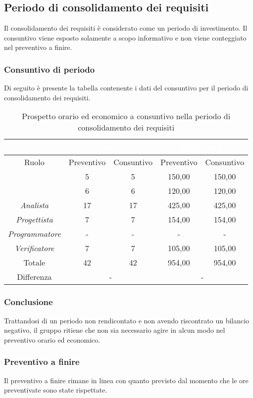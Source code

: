 \subsection{Periodo di consolidamento dei requisiti}
Il consolidamento dei requisiti è considerato come un periodo di investimento. Il consuntivo viene esposto solamente a scopo informativo e non viene conteggiato nel preventivo a finire.
\subsubsection{Consuntivo di periodo}
Di seguito è presente la tabella contenente i dati del consuntivo per il periodo di consolidamento dei requisiti.
\begin{table}[H]
	\centering
	\begin{tabular}{|c|c|c|c|c|}
		\rowcolor{darkblue} 
		&\multicolumn{2}{c|}{\textcolor{white}{Ore}}&\multicolumn{2}{c|}{\textcolor{white}{Costo in €}}\\ \hline
		Ruolo			&	Preventivo				&	Consuntivo		&	Preventivo	&	Consuntivo\\ \hline
		{\Responsabile}		&	5					&	5				&	150,00		&	150,00 \\ \hline
		{\Amministratore}	&	6					&	6				&	120,00		&	120,00 \\ \hline
		\textit{Analista}	&	17					&	17				&	425,00		&	425,00 \\ \hline
		\textit{Progettista}& 	7					&	7 				& 	154,00		&  	154,00 \\ \hline
		\textit{Programmatore}& -					& 	-				& 	-			&  	- \\ \hline
		\textit{Verificatore}&	7					&	7				&	105,00		&	105,00 \\ \hline
		Totale				&	42					&	42				&	954,00		&	954,00 \\ \hline
		Differenza			& 	\multicolumn{2}{c|}{-} 			&\multicolumn{2}{c|}{-}\\ \hline
	\end{tabular}
	\caption{Prospetto orario ed economico a consuntivo nella periodo di consolidamento dei requisiti}
\end{table}
\subsubsection{Conclusione}
Trattandosi di un periodo non rendicontato e non avendo riscontrato un bilancio negativo, il gruppo {\Gruppo} ritiene che non sia necessario agire in alcun modo nel preventivo orario ed economico.
\subsubsection{Preventivo a finire}
Il preventivo a finire rimane in linea con quanto previsto dal momento che le ore preventivate sono state rispettate.